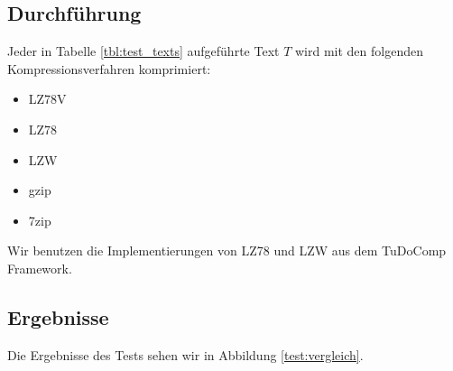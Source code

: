 \documentclass[a4paper,11pt]{scrartcl}%
\theoremstyle{change}
\theoremstyle{nonumberplain}
\theoremstyle{change}
\theoremstyle{nonumberplain}
\theoremstyle{change}
\theoremstyle{nonumberplain}
\begin{document}
\subsection{Durchführung}\label{vergleich_durch}

Jeder in Tabelle \ref{tbl:test_texts} aufgeführte Text $T$ wird mit den folgenden Kompressionsverfahren komprimiert:

\begin{itemize}
	\item LZ78V
	\item LZ78
	\item LZW
	\item gzip\cite{gzip}
	\item 7zip\cite{7zip}
\end{itemize}

Wir benutzen die Implementierungen von LZ78 und LZW aus dem TuDoComp Framework.

\subsection{Ergebnisse}

Die Ergebnisse des Tests sehen wir in Abbildung \ref{test:vergleich}.
\end{document}

